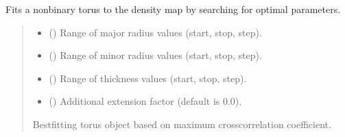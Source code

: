 \documentclass[letterpaper,10pt,english]{sphinxmanual}
\begin{document}
\begin{fulllineitems}
\begin{fulllineitems}
\label{\detokenize{src:src.BagelFitter.BagelFitter.fit_nonbinary_torus}}
\pysigstartsignatures
{}
\pysigstopsignatures
\sphinxAtStartPar
Fits a non\sphinxhyphen{}binary torus to the density map by searching for optimal parameters.
\begin{quote}\begin{description}
\begin{itemize}
\item {} 
\sphinxAtStartPar
{} (\sphinxstyleliteralemphasis{\sphinxupquote{, }}) \textendash{} Range of major radius values (start, stop, step).

\item {} 
\sphinxAtStartPar
{} (\sphinxstyleliteralemphasis{\sphinxupquote{, }}) \textendash{} Range of minor radius values (start, stop, step).

\item {} 
\sphinxAtStartPar
{} (\sphinxstyleliteralemphasis{\sphinxupquote{, }}) \textendash{} Range of thickness values (start, stop, step).

\item {} 
\sphinxAtStartPar
{} (\sphinxstyleliteralemphasis{\sphinxupquote{, }}) \textendash{} Additional extension factor (default is 0.0).

\end{itemize}

\sphinxAtStartPar
Best\sphinxhyphen{}fitting torus object based on maximum cross\sphinxhyphen{}correlation coefficient.


\end{description}
\end{quote}
\end{fulllineitems}
\end{fulllineitems}
\end{document}
